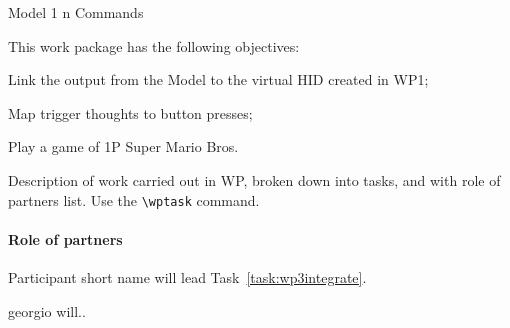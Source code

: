 
\begin{workpackage}{Model 1 n Commands}
  \label{wp:m1cN} %


  \makewptable %
    
  \begin{wpobjectives}
    This work package has the following objectives:
    \begin{enumerate*}
    \item Link the output from the Model to the virtual HID created in WP1;
    \item Map trigger thoughts to button presses; 
    \item Play a game of 1P Super Mario Bros.
    \end{enumerate*}
  \end{wpobjectives}
  
  \begin{wpdescription}
 
    Description of work carried out in WP, broken down into tasks, and
    with role of partners list. Use the \texttt{\textbackslash wptask} command.

    
    \paragraph{Role of partners}
    \begin{description*}
    \item[Participant short name] will lead Task~\ref{task:wp3integrate}.
    \item[georgio] will..
    \end{description*}
  \end{wpdescription}
  

\end{workpackage}
